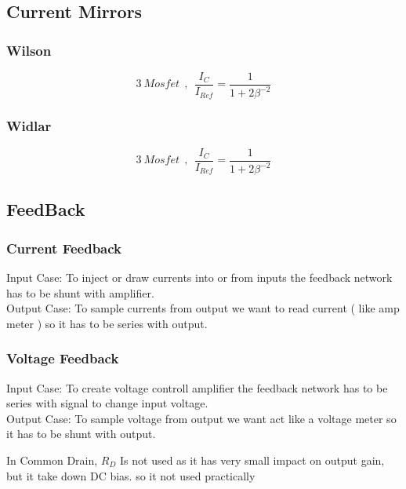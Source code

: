 \subsection{Current Mirrors}
\subsubsection{Wilson}
$$ 3~Mosfet ~~ , ~~ \frac{I_C}{I_{Ref}} = \frac{1}{1 + 2 \beta ^ {-2}} $$
\par
\subsubsection{Widlar}
$$ 3~Mosfet ~~ , ~~ \frac{I_C}{I_{Ref}} = \frac{1}{1 + 2 \beta ^ {-2}} $$
\par
\subsection{FeedBack}
\subsubsection{Current Feedback}
Input Case: To inject or draw currents into or from inputs the feedback network has to be shunt with amplifier.\\
Output Case: To sample currents from output we want to read current ( like amp meter ) so it has to be series with output.
\subsubsection{Voltage Feedback}
Input Case: To create voltage controll amplifier the feedback network has to be series with signal to change input voltage.\\
Output Case: To sample voltage from output we want act like a voltage meter so it has to be shunt with output.
\par
\setlength{\parindent}{0.5cm} %
In Common Drain, $R_D$ Is not used as it has very small impact on output gain, but it take down DC bias. so it not used practically
\lipsum[2]
\setlength{\parindent}{0.0cm} 
